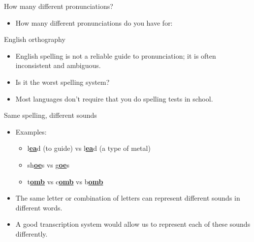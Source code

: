 \documentclass[professionalfonts]{beamer}
\begin{document}
\begin{frame}{How many different pronunciations?}
    \begin{itemize}
        \item How many different pronunciations do you have for:
    \end{itemize}
\end{frame}

\begin{frame}{English orthography}
    \begin{itemize}
        \item English spelling is not a reliable guide to pronunciation; it is often inconsistent and ambiguous.
        \item Is it the worst spelling system? 
        \item Most languages don't require that you do spelling tests in school.
    \end{itemize}
\end{frame}

\begin{frame}{Same spelling, different sounds}
    \begin{itemize}
        \item Examples:
        \begin{itemize}
            \item l\underline{\textbf{ea}}d (to guide) vs l\underline{\textbf{ea}}d (a type of metal)
            \item sh\underline{\textbf{oe}}s vs g\underline{\textbf{oe}}s
            \item t\underline{\textbf{omb}} vs c\underline{\textbf{omb}} vs b\underline{\textbf{omb}}
        \end{itemize}
        \item The same letter or combination of letters can represent different sounds in different words.
        \item A good transcription system would allow us to represent each of these sounds differently.
    \end{itemize}
\end{frame}
\end{document}
